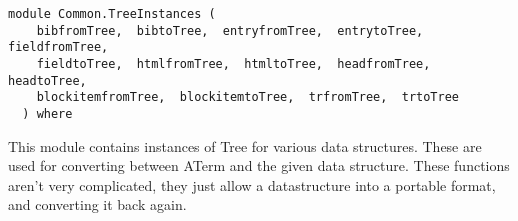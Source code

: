 \label{module:Common.TreeInstances}
\haddockbeginheader
{\haddockverb\begin{verbatim}
module Common.TreeInstances (
    bibfromTree,  bibtoTree,  entryfromTree,  entrytoTree,  fieldfromTree, 
    fieldtoTree,  htmlfromTree,  htmltoTree,  headfromTree,  headtoTree, 
    blockitemfromTree,  blockitemtoTree,  trfromTree,  trtoTree
  ) where\end{verbatim}}
\haddockendheader

This module contains instances of Tree for various data structures. These are used 
 for converting between ATerm and the given data structure. These functions aren't very 
 complicated, they just allow  a datastructure into a portable format, and 
 converting it back again.
\par

